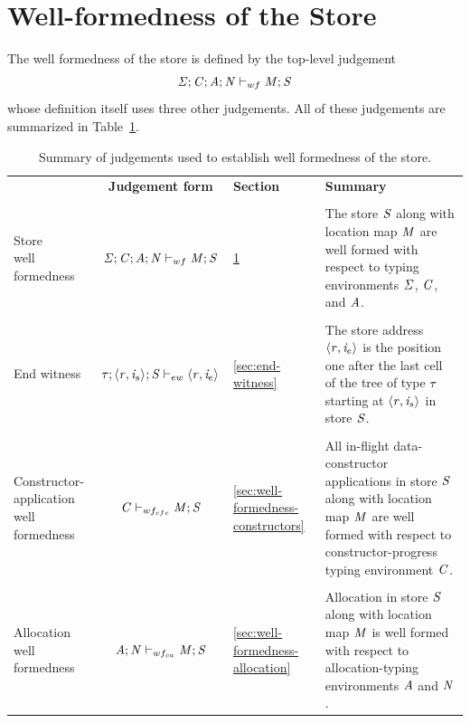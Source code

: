\documentclass[showabstract,showacknowledgments,showpreface,showdedication]{iuphd}
\theoremstyle{nonumberplain}
\begin{document}
\section{Well-formedness of the Store}
\label{sec:well-formedness}

The well formedness of the store is defined by the top-level judgement
\begin{displaymath}
\mathit{\Sigma};\mathit{C};\mathit{A};\mathit{N} \vdash_{wf} \mathit{M};\mathit{S}
\end{displaymath}
whose definition itself uses three other judgements.
%
All of these judgements are summarized in Table~\ref{tbl:swf-judgements}.

\begin{table}
\bgroup
\def\arraystretch{1.2}
\setlength\tabcolsep{0.5cm}
\begin{tabular}{lclp{6cm}}
 & \textbf{Judgement form} & \textbf{Section} &\textbf{Summary}
 \\\\
\parbox[t]{3.5cm}{Store \\ well formedness} & $\mathit{\Sigma};\mathit{C};\mathit{A};\mathit{N} \vdash_{wf} \mathit{M};\mathit{S}$ &
\ref{sec:well-formedness} &
The store $\mathit{S}$ along with location map $\mathit{M}$ are well formed with respect to
typing environments $\mathit{\Sigma}$, $\mathit{C}$, and $\mathit{A}$.
\\\\
End witness & $\mathit{\tau};\langle \mathit{r}, \mathit{i}_{s} \rangle ^{};\mathit{S} \vdash_{ew} \langle \mathit{r}, \mathit{i}_{e} \rangle ^{}$ &
\ref{sec:end-witness} &
The store address $\langle \mathit{r}, \mathit{i}_{e} \rangle ^{}$ is the position one
after the last cell of the tree of type $\mathit{\tau}$ starting at
$\langle \mathit{r}, \mathit{i}_{s} \rangle ^{}$ in store $\mathit{S}$.
\\\\
\parbox[t]{3.5cm}{Constructor-application \\ well formedness}
 & $\mathit{C} \vdash_{wf_{cfc}} \mathit{M};\mathit{S}$ &
\ref{sec:well-formedness-constructors} &
All in-flight data-constructor applications in store $\mathit{S}$ along with location map $\mathit{M}$
are well formed with respect to constructor-progress typing environment $\mathit{C}$.
\\\\
\parbox[t]{3.5cm}{Allocation \\ well formedness} & $\mathit{A};\mathit{N} \vdash_{wf_{ca}} \mathit{M};\mathit{S}$ &
\ref{sec:well-formedness-allocation} &
Allocation in store $\mathit{S}$ along with location map $\mathit{M}$ is well formed
with respect to allocation-typing environments $\mathit{A}$ and $\mathit{N}$.
\end{tabular}
\egroup
\caption{Summary of judgements used to establish well formedness of the store.}
\label{tbl:swf-judgements}
\end{table}
\end{document}
